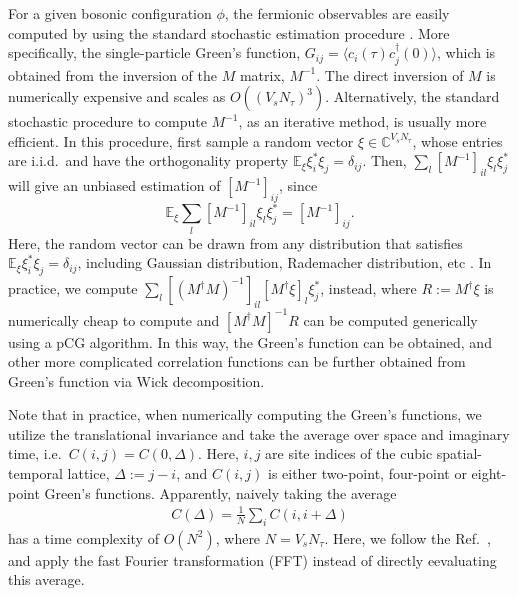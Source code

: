 \documentclass[aps,prl,twocolumn,superscriptaddress,showpacs,longbibliography]{revtex4-2}
\newcommand{\onefrac}[1]{\frac{1}{#1}}
\begin{document}
For a given bosonic configuration $\phi$, the fermionic observables are easily computed by using the standard stochastic estimation procedure \cite{Duane1987, cohen2022fast}.  More specifically, the single-particle Green's function, $G_{ij}=\langle c_{i}(\tau) c^\dagger_{j}(0)\rangle$, which is obtained from the inversion of the $M$ matrix, $M^{-1}$. The direct inversion of $M$ is numerically expensive and scales as $O((V_sN_\tau)^3)$. Alternatively, the standard stochastic procedure to compute $M^{-1}$, as an iterative method, is usually more efficient. In this procedure, first sample a random vector $\xi \in \mathbb{C}^{V_sN_\tau}$, whose entries are i.i.d.~and have the orthogonality property $\mathbb{E}_\xi \xi^*_i\xi_j = \delta_{ij}$. Then, $ \sum_l \left[M^{-1}\right]_{il} \xi_l \xi^*_j$ will give an unbiased estimation of $ \left[M^{-1}\right]_{ij}$, since
$$\mathbb{E}_\xi \sum_l \left[M^{-1}\right]_{il} \xi_l \xi^*_j = \left[M^{-1}\right]_{ij}.$$
Here, the random vector can be drawn from any distribution that satisfies $\mathbb{E}_\xi \xi^*_i\xi_j = \delta_{ij}$, including Gaussian distribution, Rademacher distribution, etc \cite{cohen2022fast}.
In practice, we compute $\sum_l \left[\left(M^{\dagger}M\right)^{-1}\right] _{il} \left[M^\dagger \xi\right]_l \xi^*_j$, instead, where $R := M^\dagger \xi$ is numerically cheap to compute and $\left[M^{\dagger}M\right]^{-1} R$ can be computed generically using a pCG algorithm.
In this way, the Green's function can be obtained, and other more complicated correlation functions can be further obtained from Green's function via Wick decomposition.

Note that in practice, when numerically computing the Green's functions, we utilize the translational invariance and take the average over space and imaginary time, i.e.~$C(i, j) = C(0, \Delta)$. Here, $i,j$ are site indices of the cubic spatial-temporal lattice, $\Delta:=j-i$, and $C(i, j)$ is either two-point, four-point or eight-point Green's functions. Apparently, naively taking the average
\begin{align}
    C(\Delta) = \onefrac{N}\sum_i C(i, i + \Delta)
\end{align}
has a time complexity of $O(N^2)$, where $N= V_s N_\tau$. Here, we follow the Ref.~\cite{cohen2022fast}, and apply the fast Fourier transformation (FFT) instead of directly eevaluating this average.
\end{document}
